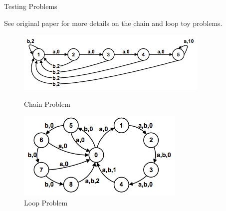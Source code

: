 \documentclass{beamer}
\begin{document}
\begin{frame}{Testing Problems}

See original paper \cite{strens} for more details on
the chain and loop toy problems.
\begin{figure}
\centering
\begin{minipage}{0.5\textwidth}
\includegraphics[width=\textwidth]{chain.png}
\caption{Chain Problem}
\end{minipage}%
\begin{minipage}{0.5\textwidth}
\includegraphics[width=\textwidth]{loop.png}
\caption{Loop Problem}
\end{minipage}%
\end{figure}


\end{frame}
\end{document}
